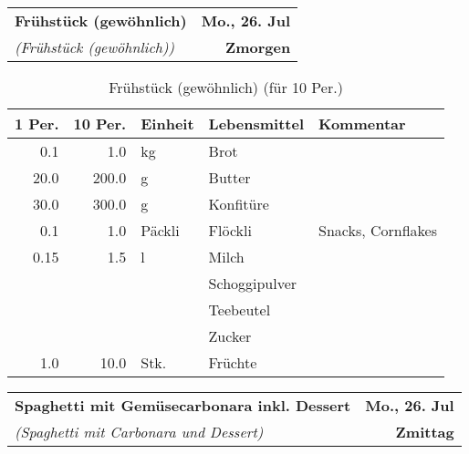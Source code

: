 \documentclass[11pt,a4paper]{article}%
\begin{document}
%
\clearpage%
\pagebreak%
\renewcommand{\arraystretch}{1.75}%
%
%


\begin{table}%
\begin{tabularx}{\textwidth}{X r}%
\LARGE \textbf{Frühstück (gewöhnlich)}&\color{gray} \large \textbf{Mo., 26. Jul}\\%
\small \textit{(Frühstück (gewöhnlich))}&\color{gray} \large \textbf{Zmorgen}\\%
\hline%
\end{tabularx}%
\end{table}

%
%
\vspace{0.75cm}%
\renewcommand{\arraystretch}{1.25}%


\begin{table}[h]%
\caption{Frühstück (gewöhnlich) (für 10 Per.)}%
\par%
\begin{tabularx}{\textwidth}{| r | r | l | l | X |}%
\hline%
\tiny{1 Per.}&\tiny{10 Per.}&\tiny{Einheit}&\tiny{Lebensmittel}&\tiny{Kommentar}\\%
\hline%
0.1&1.0&kg&Brot&\\%
\hline%
20.0&200.0&g&Butter&\\%
\hline%
30.0&300.0&g&Konfitüre&\\%
\hline%
0.1&1.0&Päckli&Flöckli&Snacks, Cornflakes\\%
\hline%
0.15&1.5&l&Milch&\\%
\hline%
&&&Schoggipulver&\\%
\hline%
&&&Teebeutel&\\%
\hline%
&&&Zucker&\\%
\hline%
1.0&10.0&Stk.&Früchte&\\%
\hline%
\end{tabularx}%
\end{table}

%
\clearpage%
\pagebreak%
\renewcommand{\arraystretch}{1.75}%
%
%


\begin{table}%
\begin{tabularx}{\textwidth}{X r}%
\LARGE \textbf{Spaghetti mit Gemüsecarbonara inkl. Dessert}&\color{gray} \large \textbf{Mo., 26. Jul}\\%
\small \textit{(Spaghetti mit Carbonara und Dessert)}&\color{gray} \large \textbf{Zmittag}\\%
\hline%
\end{tabularx}%
\end{table}
\end{document}
